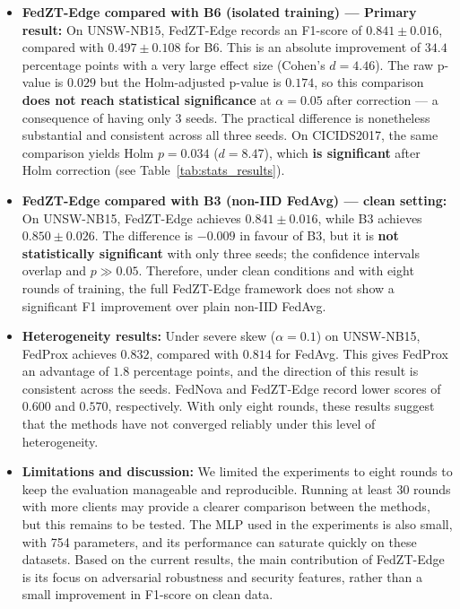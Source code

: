 \documentclass[11pt,a4paper]{article}
\begin{document}
\begin{itemize}[leftmargin=1.6em,itemsep=2pt]
    \item \textbf{FedZT-Edge compared with B6 (isolated training) --- Primary result:} On UNSW-NB15, FedZT-Edge records an F1-score of $0.841 \pm 0.016$, compared with $0.497 \pm 0.108$ for B6. This is an absolute improvement of $34.4$ percentage points with a very large effect size (Cohen's $d = 4.46$). The raw p-value is $0.029$ but the Holm-adjusted p-value is $0.174$, so this comparison \textbf{does not reach statistical significance} at $\alpha=0.05$ after correction --- a consequence of having only 3 seeds. The practical difference is nonetheless substantial and consistent across all three seeds. On CICIDS2017, the same comparison yields Holm $p=0.034$ ($d=8.47$), which \textbf{is significant} after Holm correction (see Table~\ref{tab:stats_results}).

    \item \textbf{FedZT-Edge compared with B3 (non-IID FedAvg) --- clean setting:} On UNSW-NB15, FedZT-Edge achieves $0.841 \pm 0.016$, while B3 achieves $0.850 \pm 0.026$. The difference is $-0.009$ in favour of B3, but it is \textbf{not statistically significant} with only three seeds; the confidence intervals overlap and $p \gg 0.05$. Therefore, under clean conditions and with eight rounds of training, the full FedZT-Edge framework does not show a significant F1 improvement over plain non-IID FedAvg.

    \item \textbf{Heterogeneity results:} Under severe skew ($\alpha=0.1$) on UNSW-NB15, FedProx achieves $0.832$, compared with $0.814$ for FedAvg. This gives FedProx an advantage of $1.8$ percentage points, and the direction of this result is consistent across the seeds. FedNova and FedZT-Edge record lower scores of $0.600$ and $0.570$, respectively. With only eight rounds, these results suggest that the methods have not converged reliably under this level of heterogeneity.

    \item \textbf{Limitations and discussion:} We limited the experiments to eight rounds to keep the evaluation manageable and reproducible. Running at least 30 rounds with more clients may provide a clearer comparison between the methods, but this remains to be tested. The MLP used in the experiments is also small, with 754 parameters, and its performance can saturate quickly on these datasets. Based on the current results, the main contribution of FedZT-Edge is its focus on adversarial robustness and security features, rather than a small improvement in F1-score on clean data.
\end{itemize}
\end{document}
